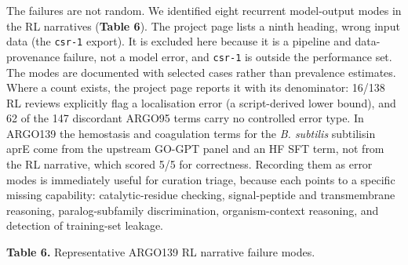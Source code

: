 \documentclass[
  11pt,
]{article}
\begin{document}
The failures are not random. We identified eight recurrent model-output modes in
the RL narratives (\textbf{Table 6}). The project page lists a ninth heading,
wrong input data (the \texttt{csr-1} export). It is excluded here because it is a
pipeline and data-provenance failure, not a model error, and \texttt{csr-1} is
outside the performance set. The modes are documented with selected cases rather
than prevalence estimates. Where a count exists, the project page reports it with
its denominator: 16/138 RL reviews explicitly flag a localisation error (a
script-derived lower bound), and 62 of the 147 discordant ARGO95 terms carry no
controlled error type. In ARGO139 the hemostasis and coagulation terms for the
\emph{B. subtilis} subtilisin aprE come from the upstream GO-GPT panel and an HF
SFT term, not from the RL narrative, which scored 5/5 for correctness. Recording them as error modes is
immediately useful for curation triage, because each points to a
specific missing capability: catalytic-residue checking, signal-peptide
and transmembrane reasoning, paralog-subfamily discrimination,
organism-context reasoning, and detection of training-set leakage.

\textbf{Table 6.} Representative ARGO139 RL narrative failure modes.
\end{document}
